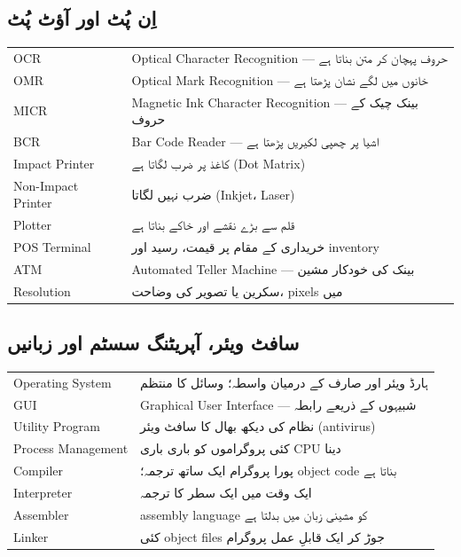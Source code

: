 \subsection*{اِن پُٹ اور آؤٹ پُٹ}

\begin{center}
\begin{tabular}{@{}p{4.0cm} p{10.4cm}@{}}
\toprule
\textenglish{OCR} & \textenglish{Optical Character Recognition} --- حروف پہچان کر متن بناتا ہے \\
\textenglish{OMR} & \textenglish{Optical Mark Recognition} --- خانوں میں لگے نشان پڑھتا ہے \\
\textenglish{MICR} & \textenglish{Magnetic Ink Character Recognition} --- بینک چیک کے حروف \\
\textenglish{BCR} & \textenglish{Bar Code Reader} --- اشیا پر چھپی لکیریں پڑھتا ہے \\
\textenglish{Impact Printer} & کاغذ پر ضرب لگاتا ہے (\textenglish{Dot Matrix}) \\
\textenglish{Non-Impact Printer} & ضرب نہیں لگاتا (\textenglish{Inkjet}، \textenglish{Laser}) \\
\textenglish{Plotter} & قلم سے بڑے نقشے اور خاکے بناتا ہے \\
\textenglish{POS Terminal} & خریداری کے مقام پر قیمت، رسید اور \textenglish{inventory} \\
\textenglish{ATM} & \textenglish{Automated Teller Machine} --- بینک کی خودکار مشین \\
\textenglish{Resolution} & سکرین یا تصویر کی وضاحت، \textenglish{pixels} میں \\
\bottomrule
\end{tabular}
\end{center}

\subsection*{سافٹ ویئر، آپریٹنگ سسٹم اور زبانیں}

\begin{center}
\begin{tabular}{@{}p{4.0cm} p{10.4cm}@{}}
\toprule
\textenglish{Operating System} & ہارڈ ویئر اور صارف کے درمیان واسطہ؛ وسائل کا منتظم \\
\textenglish{GUI} & \textenglish{Graphical User Interface} --- شبیہوں کے ذریعے رابطہ \\
\textenglish{Utility Program} & نظام کی دیکھ بھال کا سافٹ ویئر (\textenglish{antivirus}) \\
\textenglish{Process Management} & کئی پروگراموں کو باری باری \textenglish{CPU} دینا \\
\textenglish{Compiler} & پورا پروگرام ایک ساتھ ترجمہ؛ \textenglish{object code} بناتا ہے \\
\textenglish{Interpreter} & ایک وقت میں ایک سطر کا ترجمہ \\
\textenglish{Assembler} & \textenglish{assembly language} کو مشینی زبان میں بدلتا ہے \\
\textenglish{Linker} & کئی \textenglish{object files} جوڑ کر ایک قابلِ عمل پروگرام \\
\bottomrule
\end{tabular}
\end{center}

